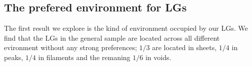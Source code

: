 \documentclass{emulateapj}
\begin{document}








\subsection{The prefered environment for LGs}

The first result we explore is the kind of environment occupied by
our LGs. We find that the LGs in the general sample are located across
all different evironment without any strong preferences; $1/3$  are
located in sheets, $1/4$ in peaks, $1/4$ in filaments and the remaning
$1/6$ in voids. 
\end{document}
